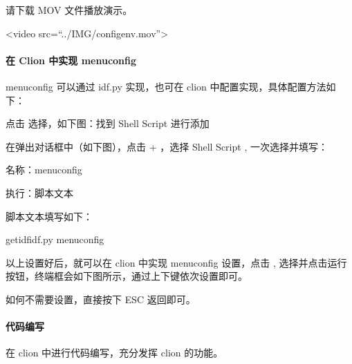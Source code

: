 \documentclass[a4paper,12pt,english]{sphinxmanual}
\begin{document}
\sphinxAtStartPar
请下载 MOV 文件播放演示。

\sphinxAtStartPar
<video src=“../IMG/config\sphinxhyphen{}env.mov”>

\sphinxAtStartPar
{}


\paragraph{在 Clion 中实现 menuconfig}
\label{\detokenize{exp-esp32/ide/esp-idf-clion-dev:clion-menuconfig}}
\sphinxAtStartPar
menuconfig 可以通过 idf.py 实现，也可在 clion 中配置实现，具体配置方法如下：

\sphinxAtStartPar
点击 选择，如下图：找到 Shell Script 进行添加

\sphinxAtStartPar
{}

\sphinxAtStartPar
在弹出对话框中（如下图），点击 + ，选择 Shell Script , 一次选择并填写：

\sphinxAtStartPar
名称：menuconfig

\sphinxAtStartPar
执行：脚本文本

\sphinxAtStartPar
脚本文本填写如下：

\begin{sphinxVerbatim}[commandchars=\\\{\}]
get\PYGZhy{}idfidf.py menuconfig
\end{sphinxVerbatim}

\sphinxAtStartPar
{}

\sphinxAtStartPar
以上设置好后，就可以在 clion 中实现 menuconfig 设置，点击 , 选择并点击运行按钮，终端框会如下图所示，通过上下键依次设置即可。

\sphinxAtStartPar
如何不需要设置，直接按下 ESC 返回即可。

\sphinxAtStartPar
{}


\paragraph{代码编写}
\label{\detokenize{exp-esp32/ide/esp-idf-clion-dev:id13}}
\sphinxAtStartPar
在 clion 中进行代码编写，充分发挥 clion 的功能。
\end{document}
